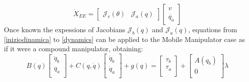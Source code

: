 \begin{equation}
\dot{X}_{EE}=\left[\begin{matrix}
\mathcal{J}_v(\theta) & \mathcal{J}_a(q)
\end{matrix}\right]\left[\begin{matrix}v\\\dot{q_a} \end{matrix}\right]
\end{equation}
Once known the expessions of Jacobians $\mathcal{J}_b(q)$ and $\mathcal{J}_a(q)$, equations from \ref{iniziodinamica} to \ref{dynamics} can be applied to the Mobile Manipulator case as if it were a compound manipulator, obtaining:
\begin{equation}
B\left(q\right)\left[
\begin{matrix}\ddot{q}_b\\\ddot{q}_a\\
\end{matrix}
\right]+C\left(q,\dot{q}\right)\left[
\begin{matrix}
\dot{q}_b\\\dot{q}_a\\
\end{matrix}\right]+g\left(q\right)= \left[
\begin{matrix}
\tau_b\\\tau_a\\
\end{matrix}\right]+\left[
\begin{matrix}
A(q_b)\\0\\
\end{matrix}\right]\lambda
\end{equation}
